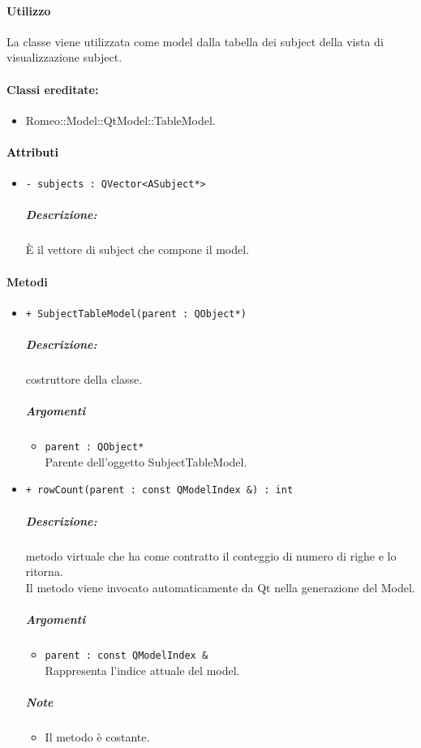 {\paragraph{Utilizzo\\}
La classe viene utilizzata come model dalla tabella dei subject\g{} della vista di visualizzazione subject\g{}.

\paragraph{Classi ereditate:}
\begin{itemize}
	\item Romeo::Model::QtModel::TableModel.
\end{itemize}

\paragraph{\textcolor{black}{Attributi\\}}
	\begin{itemize}
		\item \color{teal}\verb!- subjects : QVector<ASubject*>!
			\color{black}
			\subparagraph{Descrizione:} È il vettore di subject\g{} che compone il model.
	\end{itemize}
	
\paragraph{\color{black}Metodi\\}
\begin{itemize}
	\item \color{blue}\verb!+ SubjectTableModel(parent : QObject*)!\\
		\color{black}
		\subparagraph{Descrizione:} costruttore della classe.\\
		\subparagraph{Argomenti}
			\begin{itemize}
				\item \color{RoyalPurple}\verb!parent : QObject*!\\
				\color{Black}Parente dell'oggetto SubjectTableModel.
			\end{itemize}
			
	\item \color{blue}\verb!+ rowCount(parent : const QModelIndex &) : int!\\
	\color{black}
	\subparagraph{Descrizione:} metodo virtuale che ha come contratto il conteggio di numero di righe e lo ritorna.
	\\Il metodo viene invocato automaticamente da Qt\g{} nella generazione del Model.\\
	\subparagraph{Argomenti}
		\begin{itemize}
			\item \color{RoyalPurple}\verb!parent : const QModelIndex &!\\
			\color{Black}Rappresenta l'indice attuale del model.
		\end{itemize}
	\subparagraph{Note}
			\begin{itemize}
				\item Il metodo è costante.
			\end{itemize}
	

\end{itemize}}
